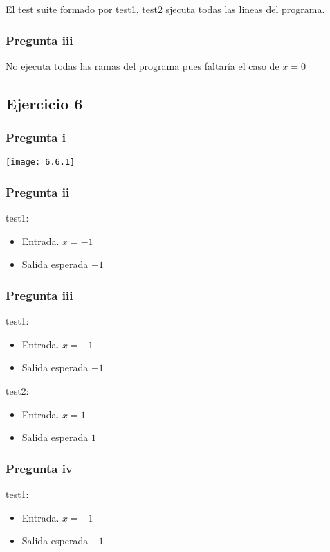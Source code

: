 El test suite formado por test1, test2 sjecuta todas las lineas del programa.

\subsubsection{Pregunta iii}
No ejecuta todas las ramas del programa pues faltaría el caso de $x = 0$

\subsection{Ejercicio 6}
\subsubsection{Pregunta i}
\texttt{[image: 6.6.1]}

\subsubsection{Pregunta ii}
test1:
\begin{itemize}
    \item Entrada. $ x = -1 $
    \item Salida esperada $ -1 $
\end{itemize}

\subsubsection{Pregunta iii}
test1:
\begin{itemize}
    \item Entrada. $ x = -1 $
    \item Salida esperada $ -1 $
\end{itemize}

test2:
\begin{itemize}
    \item Entrada. $ x = 1 $
    \item Salida esperada $ 1 $
\end{itemize}

\subsubsection{Pregunta iv}
test1:
\begin{itemize}
    \item Entrada. $ x = -1 $
    \item Salida esperada $ -1 $
\end{itemize}

